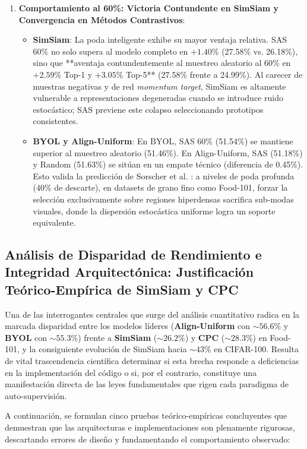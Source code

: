\begin{enumerate}
    \item \textbf{Comportamiento al 60\%: Victoria Contundente en SimSiam y Convergencia en Métodos Contrastivos}:
    \begin{itemize}
        \item \textbf{SimSiam}: La poda inteligente exhibe su mayor ventaja relativa. SAS 60\% no solo supera al modelo completo en $+1.40\%$ (27.58\% vs. 26.18\%), sino que **aventaja contundentemente al muestreo aleatorio al 60\% en $+2.59\%$ Top-1 y $+3.05\%$ Top-5** (27.58\% frente a 24.99\%). Al carecer de muestras negativas y de red \textit{momentum target}, SimSiam es altamente vulnerable a representaciones degeneradas cuando se introduce ruido estocástico; SAS previene este colapso seleccionando prototipos consistentes.
        \item \textbf{BYOL y Align-Uniform}: En BYOL, SAS 60\% (51.54\%) se mantiene superior al muestreo aleatorio (51.46\%). En Align-Uniform, SAS (51.18\%) y Random (51.63\%) se sitúan en un empate técnico (diferencia de 0.45\%). Esto valida la predicción de Sorscher et al. \cite{sorscher2022beyond}: a niveles de poda profunda (40\% de descarte), en datasets de grano fino como Food-101, forzar la selección exclusivamente sobre regiones hiperdensas sacrifica sub-modas visuales, donde la dispersión estocástica uniforme logra un soporte equivalente.
    \end{itemize}
\end{enumerate}

\subsection{Análisis de Disparidad de Rendimiento e Integridad Arquitectónica: Justificación Teórico-Empírica de SimSiam y CPC}
\label{subsec:architectural_integrity}

Una de las interrogantes centrales que surge del análisis cuantitativo radica en la marcada disparidad entre los modelos líderes (\textbf{Align-Uniform} con $\sim 56.6\%$ y \textbf{BYOL} con $\sim 55.3\%$) frente a \textbf{SimSiam} ($\sim 26.2\%$) y \textbf{CPC} ($\sim 28.3\%$) en Food-101, y la consiguiente evolución de SimSiam hacia $\sim 43\%$ en CIFAR-100. Resulta de vital trascendencia científica determinar si esta brecha responde a deficiencias en la implementación del código o si, por el contrario, constituye una manifestación directa de las leyes fundamentales que rigen cada paradigma de auto-supervisión.

A continuación, se formulan cinco pruebas teórico-empíricas concluyentes que demuestran que las arquitecturas e implementaciones son plenamente rigurosas, descartando errores de diseño y fundamentando el comportamiento observado:

